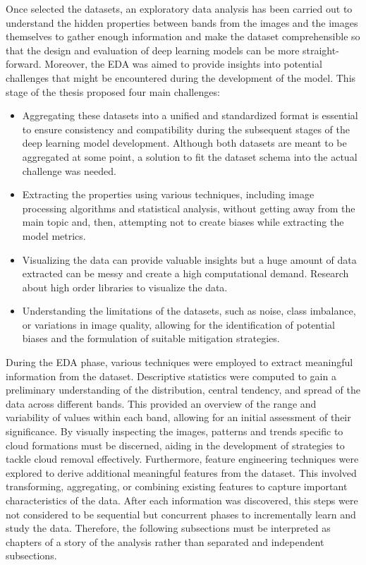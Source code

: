 	Once selected the datasets, an exploratory data analysis has been carried out to understand the hidden properties between bands from the images and the images themselves to gather enough information and make the dataset comprehensible so that the design and evaluation of deep learning models can be more straight-forward. Moreover, the EDA was aimed to provide insights into potential challenges that might be encountered during the development of the model. This stage of the thesis proposed four main challenges:
\begin{itemize}
	\item Aggregating these datasets into a unified and standardized format is essential to ensure consistency and compatibility during the subsequent stages of the deep learning model development. Although both datasets are meant to be aggregated at some point, a solution to fit the dataset schema into the actual challenge was needed.
	\item Extracting the properties using various techniques, including image processing algorithms and statistical analysis, without getting away from the main topic and, then, attempting not to create biases while extracting the model metrics.
	\item Visualizing the data can provide valuable insights but a huge amount of data extracted can be messy and create a high computational demand. Research about high order libraries to visualize the data.
	\item Understanding the limitations of the datasets, such as noise, class imbalance, or variations in image quality, allowing for the identification of potential biases and the formulation of suitable mitigation strategies.
\end{itemize}
During the EDA phase, various techniques were employed to extract meaningful information from the dataset. Descriptive statistics were computed to gain a preliminary understanding of the distribution, central tendency, and spread of the data across different bands. This provided an overview of the range and variability of values within each band, allowing for an initial assessment of their significance.
By visually inspecting the images, patterns and trends specific to cloud formations must be discerned, aiding in the development of strategies to tackle cloud removal effectively. Furthermore, feature engineering techniques were explored to derive additional meaningful features from the dataset. This involved transforming, aggregating, or combining existing features to capture important characteristics of the data. After each information was discovered, this steps were not considered to be sequential but concurrent phases to incrementally learn and study the data. Therefore, the following subsections must be interpreted as chapters of a story of the analysis rather than separated and independent subsections.
